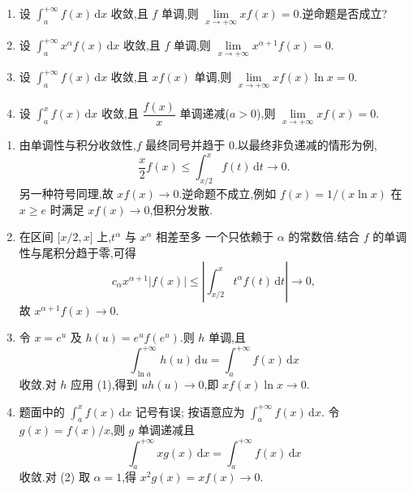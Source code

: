 \begin{example}
  \begin{enumerate}
    \item 设 $\displaystyle\int_a^{+\infty}f(x)\,\mathrm{d}x$ 收敛,且 $f$ 单调,则 $\displaystyle\lim\limits_{x\to+\infty}xf(x)=0$.逆命题是否成立?
    \item 设 $\displaystyle\int_a^{+\infty}x^\alpha f(x)\,\mathrm{d}x$ 收敛,且 $f$ 单调,则 $\displaystyle\lim\limits_{x\to+\infty}x^{\alpha+1}f(x)=0$.
    \item 设 $\displaystyle\int_a^{+\infty}f(x)\,\mathrm{d}x$ 收敛,且 $xf(x)$ 单调,则 $\displaystyle\lim\limits_{x\to+\infty}xf(x)\ln x=0$.
    \item 设 $\displaystyle\int_a^x f(x)\,\mathrm{d}x$ 收敛,且 $\dfrac{f(x)}{x}$ 单调递减($a>0$),则 $\displaystyle\lim\limits_{x\to+\infty}xf(x)=0$.
  \end{enumerate}
\end{example}
\exampleblank

\begin{solution}
  \begin{enumerate}
    \item 由单调性与积分收敛性,$f$ 最终同号并趋于 $0$.以最终非负递减的情形为例,
          \[
            \dfrac{x}{2}f(x)\leq\int_{x/2}^xf(t)\,\mathrm{d}t\longrightarrow0.
          \]
          另一种符号同理,故 $xf(x)\to0$.逆命题不成立,例如
          $f(x)=1/(x\ln x)$ 在 $x\geq e$ 时满足 $xf(x)\to0$,但积分发散.

    \item 在区间 $\lbrack x/2,x\rbrack$ 上,$t^\alpha$ 与 $x^\alpha$ 相差至多
          一个只依赖于 $\alpha$ 的常数倍.结合 $f$ 的单调性与尾积分趋于零,可得
          \[
            c_\alpha x^{\alpha+1}|f(x)|
            \leq\left|\int_{x/2}^xt^\alpha f(t)\,\mathrm{d}t\right|\longrightarrow0,
          \]
          故 $x^{\alpha+1}f(x)\to0$.

    \item 令 $x=e^u$ 及 $h(u)=e^u f(e^u)$.则 $h$ 单调,且
          \[
            \int_{\ln a}^{+\infty}h(u)\,\mathrm{d}u
            =\int_a^{+\infty}f(x)\,\mathrm{d}x
          \]
          收敛.对 $h$ 应用 (1),得到 $u h(u)\to0$,即
          $xf(x)\ln x\to0$.

    \item 题面中的 $\displaystyle\int_a^x f(x)\,\mathrm{d}x$ 记号有误;
          按语意应为 $\displaystyle\int_a^{+\infty}f(x)\,\mathrm{d}x$.
          令 $g(x)=f(x)/x$,则 $g$ 单调递减且
          \[
            \int_a^{+\infty}xg(x)\,\mathrm{d}x
            =\int_a^{+\infty}f(x)\,\mathrm{d}x
          \]
          收敛.对 (2) 取 $\alpha=1$,得 $x^2g(x)=xf(x)\to0$.
  \end{enumerate}
\end{solution}

